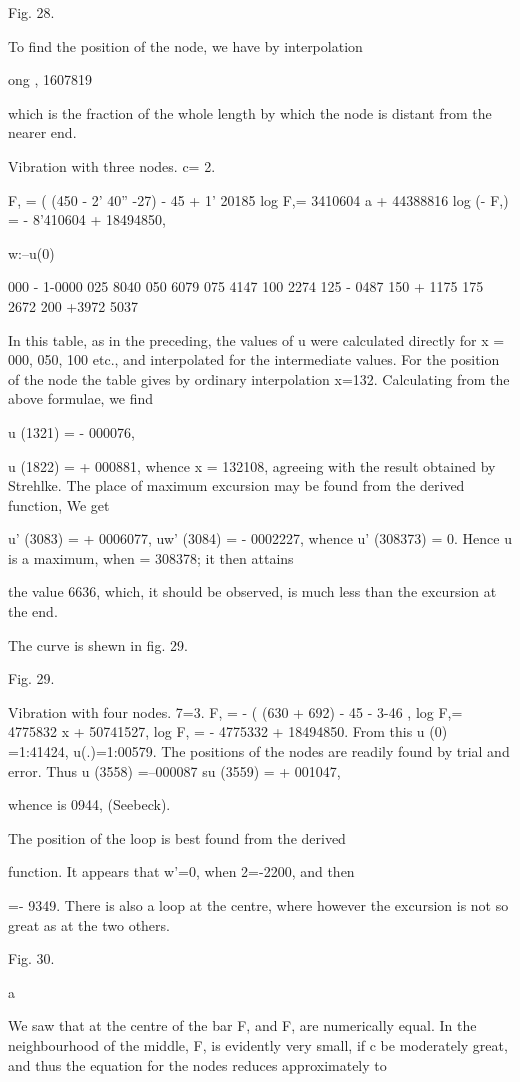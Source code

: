 Fig. 28.

To find the position of the node, we have by interpolation

ong , 1607819


which is the fraction of the whole length by which the node is distant
from the nearer end.

Vibration with three nodes. c= 2.

F, = ( (450 - 2' 40'' -27) - 45 + 1' 20185 log F,= 3410604 a + 44388816
log (- F,) = - 8'410604 + 18494850,

w:--u(0)

000 - 1-0000 025 8040 050 6079 075 4147 100 2274 125 - 0487 150 + 1175
175 2672 200 +3972 5037

In this table, as in the preceding, the values of u were calculated
directly for x = 000, 050, 100 etc., and interpolated for the
intermediate values. For the position of the node the table gives by
ordinary interpolation x=132. Calculating from the above formulae, we
find

u (1321) = - 000076,

u (1822) = + 000881, whence x = 132108, agreeing with the result
obtained by Strehlke. The place of maximum excursion may be found from
the derived function, We get

u' (3083) = + 0006077, uw' (3084) = - 0002227, whence u' (308373) = 0.
Hence u is a maximum, when = 308378; it then attains

the value 6636, which, it should be observed, is much less than the
excursion at the end.

The curve is shewn in fig. 29.

Fig. 29.

Vibration with four nodes. 7=3. F, = - ( (630 + 692) - 45 - 3-46 , log
F,= 4775832 x + 50741527, log F, = - 4775332 + 18494850. From this u (0)
=1:41424, u(.)=1:00579. The positions of the nodes are readily found by
trial and error. Thus u (3558) =--000087 su (3559) = + 001047,

whence is 0944, (Seebeck).

The position of the loop is best found from the derived

function. It appears that w'=0, when 2=-2200, and then

=- 9349. There is also a loop at the centre, where however the excursion
is not so great as at the two others.

Fig. 30.

a

We saw that at the centre of the bar F, and F, are numerically equal. In
the neighbourhood of the middle, F, is evidently very small, if c be
moderately great, and thus the equation for the nodes reduces
approximately to

